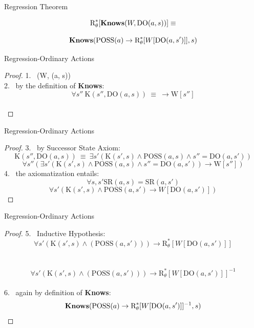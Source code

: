 \begin{frame}{Regression Theorem}
    \begin{theorem}
        \[ \text{R}^*_{\theta}[\textbf{Knows}(W, \text{DO}(a, s))] \equiv \]
            
        \[ \textbf{Knows}(\text{POSS}(a) \rightarrow \text{R}^*_{\theta}[W[\text{DO}(a, s')]], s) \]
    \end{theorem}    
\end{frame}

\begin{frame}{Regression-Ordinary Actions}
    \begin{proof}  
       1. \ \knows(W, (a, s)) \\
       2. \ by the definition of \textbf{Knows}: \ \[ \forall s'' \  \text{K}(s'', \text{DO}(a, s)) \ \equiv \ \rightarrow \text{W}[s''] \] \\
    \end{proof} 
\end{frame} 

\begin{frame}{Regression-Ordinary Actions}
    \begin{proof}  
       3. \ by Successor State Axiom: \[ \text{K}(s'', \text{DO}(a, s)) \ \equiv \ \exists s'(\text{K}(s',s) \land \text{POSS}(a, s) \land s'' = \text{DO}(a, s'))\]
          \[ \forall s''(\exists s'(\text{K}(s',s) \land \text{POSS}(a, s) \land s'' = \text{DO}(a, s')) \rightarrow \text{W}[s''])  \]
       4. \ the axiomatization entails: \[ \forall s,s' \text{SR}(a, s) = \text{SR}(a, s') \] 
          \[ \forall s'(\text{K}(s',s) \land \text{POSS}(a, s') \rightarrow W[\text{DO}(a, s')]) \]
    \end{proof}
\end{frame}

\begin{frame}{Regression-Ordinary Actions}

    \begin{proof}  
       5. \ Inductive Hypothesis: \[ \forall s'(\text{K}(s',s) \land (\text{POSS}(a, s'))) \rightarrow \text{R}^*_{\theta}[W[\text{DO}(a, s')]] \] \\
          \ \[ \forall s'(\text{K}(s',s) \land (\text{POSS}(a, s'))) \rightarrow \text{R}^*_{\theta}[W[\text{DO}(a, s')]]^{-1} \] \\
       
       6. \ again by definition of \textbf{Knows}: \  \[ \textbf{Knows}(\text{POSS}(a) \rightarrow \text{R}^*_{\theta}[W[\text{DO}(a, s')]]^{-1}, s) \]
    \end{proof} 

\end{frame}


